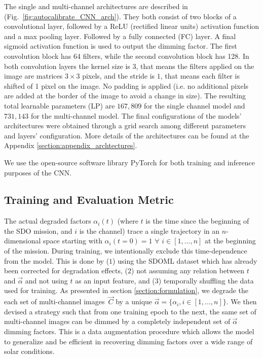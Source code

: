 \documentclass{aa}
\begin{document}
The single and multi-channel architectures are described in (Fig.~\ref{fig:autocalibrate_CNN_arch}). They both consist of two blocks of a convolutional layer, followed by a ReLU (rectified linear units) activation function \citep{Nair:2010:RLU:3104322.3104425} and a max pooling layer. Followed by a fully connected (FC) layer. A final sigmoid activation function is used to output the dimming factor. The first convolution block has 64 filters, while the second convolution block has 128. In both convolution layers the kernel size is $3$, that means the filters applied on the image are matrices $3\times3$ pixels, and the stride is $1$, that means each filter is shifted of 1 pixel on the image. No padding is applied (i.e. no additional pixels are added at the border of the image to avoid a change in size). The resulting total learnable parameters (LP) are $167,809$ for the single channel model and $731,143$ for the multi-channel model. The final configurations of the models' architectures were obtained through a grid search among different parameters and layers' configuration. More details of the architectures can be found at the Appendix \ref{section:appendix_archtectures}. 


We use the open-source software library PyTorch \citep{paszke_2017} for both training and inference purposes of the CNN.

\subsection{Training and Evaluation Metric}
\label{Section:Analysis}
The actual degraded factors $\alpha_i(t)$ (where $t$ is the time since the beginning of the SDO mission, and $i$ is the channel) trace a single trajectory in an $n$-dimensional space starting with $\alpha_i(t=0)=1$ $\forall$ $i\in[1,...,n]$ at the beginning of the mission. During training, we intentionally exclude this time-dependence from the model. This is done by ($1$) using the SDOML dataset which has already been corrected for degradation effects, ($2$) not assuming any relation between $t$ and $\vec{\alpha}$ and not using $t$ as an input feature, and ($3$) temporally shuffling the data used for training. As presented in section \ref{section:formulation}, we degrade the each set of multi-channel images~$\vec{C}$ by a unique $\vec{\alpha} = \{\alpha_i, i \in [1,...,n]\}$. We then devised a strategy such that from one training epoch to the next, the same set of multi-channel images can be dimmed by a completely independent set of $\vec{\alpha}$ dimming factors. This is a data augmentation procedure which allows the model to generalize and be efficient in recovering dimming factors over a wide range of solar conditions.
\end{document}
